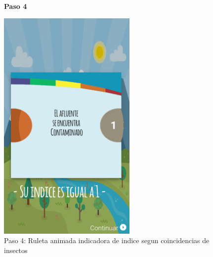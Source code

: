 				\begin{figure}
					\centering
					\textbf{Paso 4}\par\medskip
						\includegraphics[width=0.6\textwidth]{Screenshots/ruedita.png}
						\caption{Paso 4: Ruleta animada indicadora de indice segun coincidencias de insectos}
				\end{figure}

